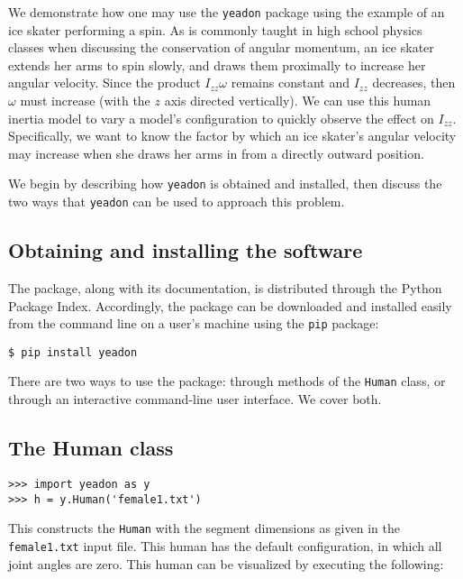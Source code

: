 \documentclass[10pt]{article}
\begin{document}
We demonstrate how one may use the \verb+yeadon+ package using the example of
an ice skater performing a spin. As is commonly taught in high school physics
classes when discussing the conservation of angular momentum, an ice skater
extends her arms to spin slowly, and draws them proximally to increase her
angular velocity. Since the product $I_{zz}\omega$ remains constant and $I_{zz}$
decreases, then $\omega$ must increase (with the $z$ axis directed vertically).
We can use this human inertia model to vary a model's configuration to quickly
observe the effect on $I_{zz}$. Specifically, we want to know the factor by
which an ice skater's angular velocity may increase when she draws her arms in
from a directly outward position.

We begin by describing how \verb+yeadon+ is obtained and installed, then
discuss the two ways that \verb+yeadon+ can be used to approach this problem.

\subsection*{Obtaining and installing the software}

The package, along with its documentation, is distributed through the Python
Package Index. Accordingly, the package can be downloaded and installed easily
from the command line on a user's machine using the \verb+pip+ package:

\begin{verbatim}
$ pip install yeadon
\end{verbatim}

There are two ways to use the package: through methods of the \verb+Human+
class, or through an interactive command-line user interface. We cover both.



\subsection*{The Human class}

\begin{verbatim}
>>> import yeadon as y
>>> h = y.Human('female1.txt')
\end{verbatim}

This constructs the \verb+Human+ with the segment dimensions as given in the
\verb+female1.txt+ input file. This human has the default configuration, in
which all joint angles are zero. This human can be visualized by executing the
following:
\end{document}
